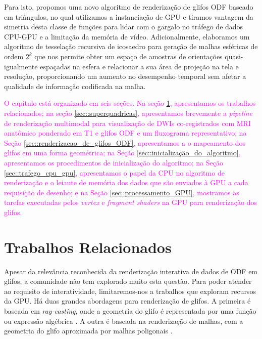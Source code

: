 Para isto, propomos uma novo algoritmo de renderização de glifos ODF baseado em triângulos, no qual utilizamos a instanciação de GPU e tiramos vantagem da simetria desta classe de funções para lidar com o gargalo no tráfego de dados CPU-GPU e a limitação da memória de vídeo. Adicionalmente, elaboramos um algoritmo de tesselação recursiva de icosaedro para geração de malhas esféricas de ordem $2^k$  que nos permite  obter um espaço de amostras de orientações quasi-igualmente espaçadas na esfera e relacionar a sua área de projeção na tela e resolução, proporcionando um aumento no desempenho temporal sem afetar a qualidade de informação codificada na malha.

\textcolor{magenta}{
O capítulo está organizado em seis seções. Na seção \ref{sec::trabalhos_relacionados}, apresentamos os trabalhos relacionados; na seção \ref{sec::superquadricas}, apresentamos brevemente a \textit{pipeline} de renderização multimodal para visualização de DWIs co-registrados com MRI anatômico ponderado em T1 e glifos ODF e um fluxograma representativo; na Seção \ref{sec::renderizacao_de_glifos_ODF}, apresentamos a o mapeamento dos glifos em uma forma geométrica; na Seção \ref{sec::inicialização_do_algoritmo}, apresentamos os procedimentos de inicialização do algoritmo; na Seção \ref{sec::trafego_cpu_gpu}, apresentamos o papel da CPU no algoritmo de renderização e o leiaute de memória dos dados que são enviados à GPU a cada requisição de desenho; e na Seção \ref{sec::processamento_GPU}, mostramos as tarefas executadas pelos \textit{vertex} e \textit{fragment shaders} na GPU para renderização dos glifos.
}


\section{Trabalhos Relacionados}
\label{sec::trabalhos_relacionados}

Apesar da relevância reconhecida da renderização interativa de dados de ODF em glifos, a comunidade não tem explorado muito esta questão. Para poder atender ao requisito de interatividade, limitaremos-nos a trabalhos que exploram recursos da GPU. Há duas grandes abordagens para renderização de glifos. A primeira é baseada em \textit{ray-casting}, onde a geometria do glifo é representada por uma função ou expressão algébrica \cite{peeters2009, almsick2011}. A outra é baseada na renderização de malhas, com a geometria do glifo aproximada por malhas poligonais \cite{shattuck2008}.

